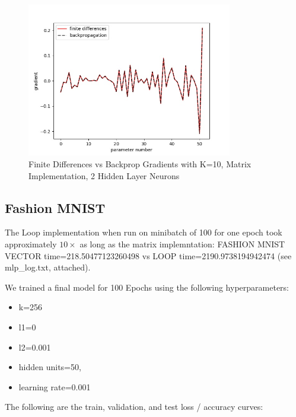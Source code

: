 \documentclass[reqno]{amsart}
\theoremstyle{definition}
\theoremstyle{remark}
\numberwithin{equation}{section}
\begin{document}
\begin{figure}[H]
    \centering
    \includegraphics[width=0.8\textwidth]{gradient_differences_MATRIX_k10}
    \caption{Finite Differences vs Backprop Gradients with K=10, Matrix Implementation, 2 Hidden Layer Neurons}
    \label{fig:gradient_differences_MATRIX_k10}
\end{figure}

\subsection{Fashion MNIST}

The Loop implementation when run on minibatch of 100 for one epoch took approximately $10\times$ as long as the matrix implemntation: FASHION MNIST VECTOR time=218.50477123260498 vs LOOP time=2190.9738194942474 (see mlp\_log.txt, attached).

We trained a final model for 100 Epochs using the following hyperparameters:

\begin{itemize}
    \item k=256
    \item l1=0
    \item l2=0.001
    \item hidden units=50, 
    \item learning rate=0.001     
\end{itemize}

The following are the train, validation, and test loss / accuracy curves: \\
\end{document}
